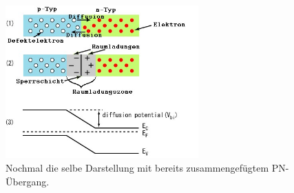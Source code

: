 \begin{figure}
    \centering
    \includegraphics[width=0.66\textwidth]{fig/pn-banddiagramm2}
    \caption{Nochmal die selbe Darstellung mit bereits zusammengefügtem PN-Übergang.}
    \label{fig:pn-banddiagramm}
\end{figure}

